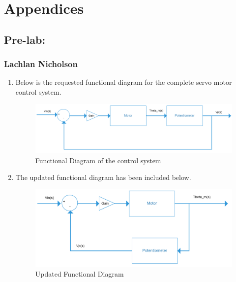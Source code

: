 \documentclass[11pt,a4paper]{article}
\begin{document}
\section{Appendices}
\subsection{Pre-lab:}
\subsubsection{Lachlan Nicholson}
\begin{enumerate}
	\item Below is the requested functional diagram for the complete servo motor control system.    
    \begin{figure}[H]
	\centering
	\includegraphics[width=.8\textwidth]{PreLach/A2a.png}
	\caption{\label{fig:funcagram}Functional Diagram of the control system}
	\end{figure}
    
    
	\item The updated functional diagram has been included below.
    \begin{figure}[H]
	\centering
	\includegraphics[width=.8\textwidth]{PreLach/A2b.png}
	\caption{\label{fig:updatedfuncagram}Updated Functional Diagram}
	\end{figure}
    
    
    

\end{enumerate}
\end{document}
